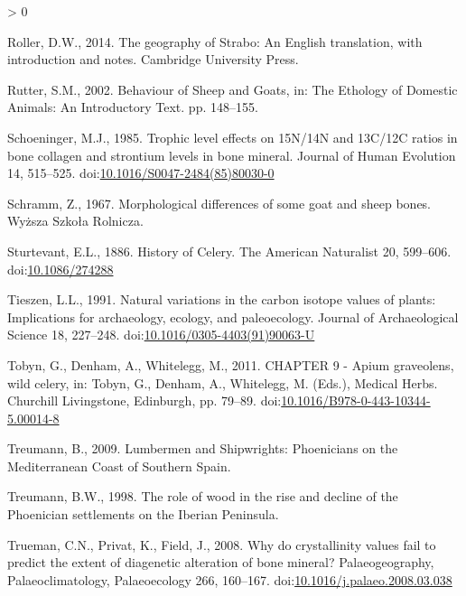 \documentclass[5p]{elsarticle} %
\newlength{\cslhangindent}
\newenvironment{CSLReferences}[2] %
 {%
  \setlength{\parindent}{0pt}
  \ifodd #1 \everypar{\setlength{\hangindent}{\cslhangindent}}\ignorespaces\fi
  \ifnum #2 > 0
  \setlength{\parskip}{#2\baselineskip}
  \fi
 }%
 {}
\begin{document}
\begin{CSLReferences}{1}{0}
\leavevmode\hypertarget{ref-roller14}{}%
Roller, D.W., 2014. The geography of {Strabo}: {An English} translation, with introduction and notes. {Cambridge University Press}.

\leavevmode\hypertarget{ref-rutter02}{}%
Rutter, S.M., 2002. Behaviour of {Sheep} and {Goats}, in: The Ethology of Domestic Animals: {An} Introductory Text. pp. 148--155.

\leavevmode\hypertarget{ref-schoeninger85}{}%
Schoeninger, M.J., 1985. Trophic level effects on {15N}/{14N} and {13C}/{12C} ratios in bone collagen and strontium levels in bone mineral. Journal of Human Evolution 14, 515--525. doi:\href{https://doi.org/10.1016/S0047-2484(85)80030-0}{10.1016/S0047-2484(85)80030-0}

\leavevmode\hypertarget{ref-schramm67}{}%
Schramm, Z., 1967. Morphological differences of some goat and sheep bones. {Wyższa Szkoła Rolnicza}.

\leavevmode\hypertarget{ref-sturtevant86}{}%
Sturtevant, E.L., 1886. History of {Celery}. The American Naturalist 20, 599--606. doi:\href{https://doi.org/10.1086/274288}{10.1086/274288}

\leavevmode\hypertarget{ref-tieszen91}{}%
Tieszen, L.L., 1991. Natural variations in the carbon isotope values of plants: {Implications} for archaeology, ecology, and paleoecology. Journal of Archaeological Science 18, 227--248. doi:\href{https://doi.org/10.1016/0305-4403(91)90063-U}{10.1016/0305-4403(91)90063-U}

\leavevmode\hypertarget{ref-tobyn_etal11}{}%
Tobyn, G., Denham, A., Whitelegg, M., 2011. {CHAPTER} 9 - {Apium} graveolens, wild celery, in: Tobyn, G., Denham, A., Whitelegg, M. (Eds.), Medical {Herbs}. {Churchill Livingstone}, {Edinburgh}, pp. 79--89. doi:\href{https://doi.org/10.1016/B978-0-443-10344-5.00014-8}{10.1016/B978-0-443-10344-5.00014-8}

\leavevmode\hypertarget{ref-treumann09}{}%
Treumann, B., 2009. Lumbermen and {Shipwrights}: {Phoenicians} on the {Mediterranean Coast} of {Southern Spain}.

\leavevmode\hypertarget{ref-treumann98}{}%
Treumann, B.W., 1998. The role of wood in the rise and decline of the {Phoenician} settlements on the {Iberian Peninsula}.

\leavevmode\hypertarget{ref-trueman_etal08}{}%
Trueman, C.N., Privat, K., Field, J., 2008. Why do crystallinity values fail to predict the extent of diagenetic alteration of bone mineral? Palaeogeography, Palaeoclimatology, Palaeoecology 266, 160--167. doi:\href{https://doi.org/10.1016/j.palaeo.2008.03.038}{10.1016/j.palaeo.2008.03.038}


\end{CSLReferences}
\end{document}
